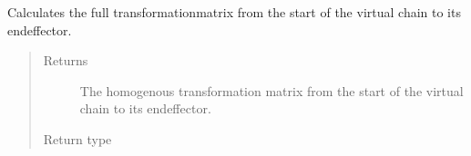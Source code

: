 \documentclass[letterpaper,10pt,english]{sphinxmanual}
\begin{document}
\begin{fulllineitems}
\begin{quote}
\begin{description}
\begin{itemize}
\end{itemize}

\end{description}\end{quote}

\begin{fulllineitems}
\label{\detokenize{code_docu:trip_kinematics.KinematicGroup.KinematicGroup.get_transformation_matrix}}
Calculates the full transformationmatrix from the start of the virtual chain to its endeffector.
\begin{quote}\begin{description}
\item[{Returns}] \leavevmode
The homogenous transformation matrix from the start of the virtual chain to its endeffector.

\item[{Return type}] \leavevmode
{\hyperref[\detokenize{code_docu:trip_kinematics.HomogenTransformationMatrix.TransformationMatrix}]{}}

\end{description}\end{quote}

\end{fulllineitems}



\end{fulllineitems}
\end{document}
